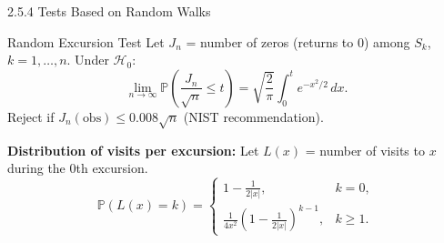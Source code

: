 \documentclass[aspectratio=169,10pt]{beamer}
\begin{document}
\begin{frame}[allowframebreaks]{2.5.4 Tests Based on Random Walks}
\framebreak

\begin{block}{Random Excursion Test}
Let $J_n$ = number of zeros (returns to 0) among $S_k$, $k=1,\ldots,n$.
Under $\mathcal{H}_0$:
\[
  \lim_{n\to\infty} \mathbb{P}\!\left(\frac{J_n}{\sqrt{n}} \le t\right)
  = \sqrt{\frac{2}{\pi}}\int_0^t e^{-x^2/2}\,dx.
\]
Reject if $J_n(\text{obs}) \le 0.008\sqrt{n}$ (NIST recommendation).
\end{block}

\medskip
\textbf{Distribution of visits per excursion:}
Let $L(x)$ = number of visits to $x$ during the 0th excursion.
\[
  \mathbb{P}(L(x)=k) = \begin{cases}
    1 - \frac{1}{2|x|}, & k=0,\\
    \frac{1}{4x^2}\left(1-\frac{1}{2|x|}\right)^{k-1}, & k \ge 1.
  \end{cases}
  \tag{2.5.22}
\]

\end{frame}
\end{document}

